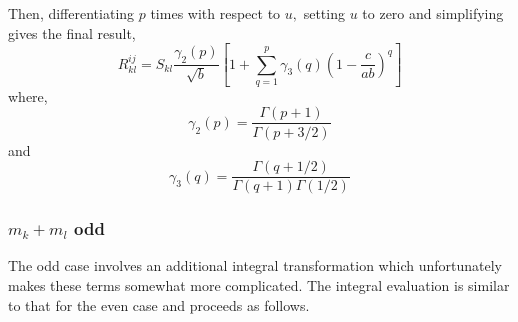 \documentclass[12pt,doublespace]{article}
\begin{document}
Then, differentiating $p$ times with respect to $u,$ setting $u$ to zero and
simplifying gives the final result, 
\begin{equation}
R_{kl}^{ij}=S_{kl}\frac{\gamma _{2}\left( p\right) }{\sqrt{b}}\left[
1+\sum_{q=1}^{p}\gamma _{3}\left( q\right) \left( 1-\frac{c}{ab}\right) ^{q}%
\right]  \label{Rkleven}
\end{equation}
where, 
\begin{equation}
\gamma _{2}\left( p\right) =\frac{\Gamma \left( p+1\right) }{\Gamma \left(
p+3/2\right) }  \label{gamma2}
\end{equation}
and 
\begin{equation}
\gamma _{3}\left( q\right) =\frac{\Gamma \left( q+1/2\right) }{\Gamma \left(
q+1\right) \Gamma \left( 1/2\right) }  \label{gamma3}
\end{equation}

\subsubsection{$m_{k}+m_{l}$ odd}

The odd case involves an additional integral transformation which
unfortunately makes these terms somewhat more complicated. The integral
evaluation is similar to that for the even case and proceeds as follows.
\end{document}
